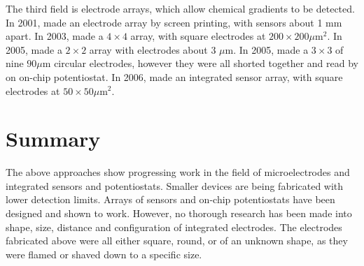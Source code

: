 The third field is electrode arrays, which allow chemical gradients to be detected. In 2001, \cite{george2001fsp} made an electrode array by screen printing, with sensors about 1 $\mathrm{mm}$ apart. In 2003, \cite{naware2003dam} made a $4 \times 4$ array, with square electrodes at $200 \times 200 \mu \mathrm{m}^2$. In 2005, \cite{hafez2005eif} made a $2 \times 2$ array with electrodes about 3 $\mu \mathrm{m}$. In 2005, \cite{zhang2005eam} made a $3 \times 3$ of nine $90 \mu \mathrm{m}$ circular electrodes, however they were all shorted together and read by on on-chip potentiostat. In 2006, \cite{hassibi2006pmuc} made an integrated sensor array, with square electrodes at $50 \times 50 \mu \mathrm{m}^2$.

\section{Summary}

The above approaches show progressing work in the field of microelectrodes and integrated sensors and potentiostats. Smaller devices are being fabricated with lower detection limits. Arrays of sensors and on-chip potentiostats have been designed and shown to work. However, no thorough research has been made into shape, size, distance and configuration of integrated electrodes. The electrodes fabricated above were all either square, round, or of an unknown shape, as they were flamed or shaved down to a specific size.
